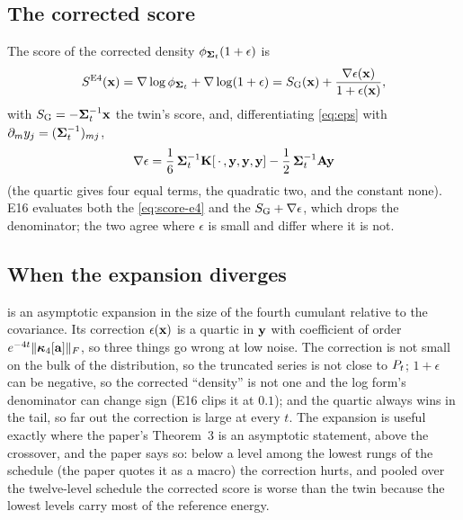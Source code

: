 \subsection{The corrected score}

The score of the corrected density $\phi_{\mathbf{\Sigma}_t}(1+\epsilon)$ is
\begin{equation}
  S^{\mathrm{E4}}(\mathbf{x})=\nabla\log\phi_{\mathbf{\Sigma}_t}+\nabla\log(1+\epsilon)=S_{\mathrm{G}}(\mathbf{x})+\frac{\nabla\epsilon(\mathbf{x})}{1+\epsilon(\mathbf{x})},
  \label{eq:score-e4}
\end{equation}
with $S_{\mathrm{G}}=-\mathbf{\Sigma}_t^{-1}\mathbf{x}$ the twin's score, and, differentiating \cref{eq:eps} with
$\partial_my_j=(\mathbf{\Sigma}_t^{-1})_{mj}$,
\begin{equation}
  \nabla\epsilon=\frac16\,\mathbf{\Sigma}_t^{-1}\mathbf{K}[\,\cdot\,,\mathbf{y},\mathbf{y},\mathbf{y}]-\frac12\,\mathbf{\Sigma}_t^{-1}\mathbf{A}\mathbf{y}
  \label{eq:grad-eps}
\end{equation}
(the quartic gives four equal terms, the quadratic two, and the constant none). E16
evaluates both the  \cref{eq:score-e4} and the 
$S_{\mathrm{G}}+\nabla\epsilon$, which drops the denominator; the two agree where $\epsilon$ is
small and differ where it is not.

\subsection{When the expansion diverges}

 is an asymptotic expansion in the size of the fourth cumulant
relative to the covariance. Its correction $\epsilon(\mathbf{x})$ is a quartic in
$\mathbf{y}$ with coefficient of order $e^{-4t}\lVert \bm{\kappa}_4[\mathbf{a}] \rVert_{F}$, so three things go
wrong at low noise. The correction is not small on the bulk of the distribution, so the
truncated series is not close to $P_t$; $1+\epsilon$ can be negative, so the corrected
``density'' is not one and the log form's denominator can change sign (E16 clips it at
$0.1$); and the quartic always wins in the tail, so far out the correction is large at
every $t$. The expansion is useful exactly where the paper's Theorem~3 is an asymptotic
statement, above the crossover, and the paper says so: below a level among the lowest
rungs of the schedule (the paper quotes it as a macro) the correction hurts, and pooled over the twelve-level schedule the corrected score is
worse than the twin because the lowest levels carry most of the reference energy.

